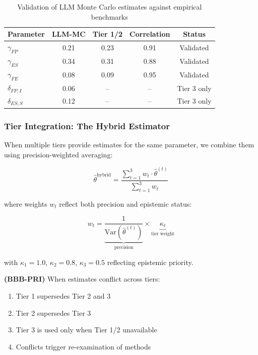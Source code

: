\begin{table}[h]
\centering
\small
\begin{tabular}{lcccc}
\toprule
\textbf{Parameter} & \textbf{LLM-MC} & \textbf{Tier 1/2} & \textbf{Correlation} & \textbf{Status} \\
\midrule
$\gamma_{FP}$ & 0.21 & 0.23 & 0.91 & Validated \\
$\gamma_{ES}$ & 0.34 & 0.31 & 0.88 & Validated \\
$\gamma_{FE}$ & 0.08 & 0.09 & 0.95 & Validated \\
$\delta_{FP,I}$ & 0.06 & -- & -- & Tier 3 only \\
$\delta_{ES,S}$ & 0.12 & -- & -- & Tier 3 only \\
\bottomrule
\end{tabular}
\caption{Validation of LLM Monte Carlo estimates against empirical benchmarks}
\label{tab:tier3-validation}
\end{table}

\subsubsection{Tier Integration: The Hybrid Estimator}

When multiple tiers provide estimates for the same parameter, we combine them 
using precision-weighted averaging:

\begin{equation}
\hat{\theta}^{\text{hybrid}} = \frac{\sum_{t=1}^{3} w_t \cdot \hat{\theta}^{(t)}}{\sum_{t=1}^{3} w_t}
\end{equation}

where weights $w_t$ reflect both precision and epistemic status:

\begin{equation}
w_t = \underbrace{\frac{1}{\text{Var}(\hat{\theta}^{(t)})}}_{\text{precision}} \times \underbrace{\kappa_t}_{\text{tier weight}}
\end{equation}

with $\kappa_1 = 1.0$, $\kappa_2 = 0.8$, $\kappa_3 = 0.5$ reflecting epistemic priority.

\begin{axiom}
\label{ax:bbb-priority}
\textbf{(BBB-PRI)} When estimates conflict across tiers:
\begin{enumerate}
    \item Tier 1 supersedes Tier 2 and 3
    \item Tier 2 supersedes Tier 3
    \item Tier 3 is used only when Tier 1/2 unavailable
    \item Conflicts trigger re-examination of methods
\end{enumerate}
\end{axiom}


